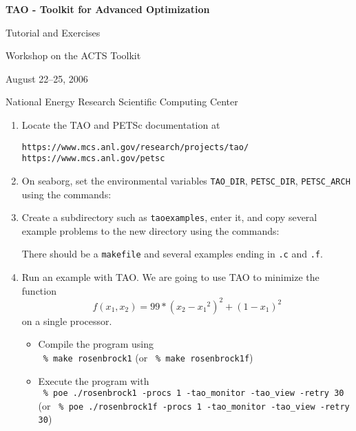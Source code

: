 \documentclass[11pt]{article}
\begin{document}
\begin{center}
{\bf
TAO - Toolkit for Advanced Optimization
        
Tutorial and Exercises

\vspace{0.25in}

Workshop on the ACTS Toolkit

August 22--25, 2006

National Energy Research Scientific Computing Center
}
\end{center}
\vspace{0.25in}

\begin{enumerate}

\item Locate the TAO and PETSc documentation at 
\begin{alltt}
https://www.mcs.anl.gov/research/projects/tao/
https://www.mcs.anl.gov/petsc
\end{alltt}

\item On seaborg, set the environmental variables
\texttt{TAO\_DIR}, \texttt{PETSC\_DIR}, \texttt{PETSC\_ARCH} 
using the commands:
\begin{alltt}
% module load tao/1.8.1
% export PETSC_ARCH=rs6000_sp_g_c++
\end{alltt}

\item Create a subdirectory such as \texttt{taoexamples}, enter it, and copy several example problems to the new directory using the commands:
\begin{alltt}
% mkdir taoexamples
% cd taoexamples
% cp -R \$TAO_DIR/src/unconstrained/tutorials/* .
% ls
\end{alltt}
There should be a \texttt{makefile} and several examples ending in \texttt{.c} and \texttt{.f}.

\item Run an example with TAO.
We are going to use TAO to minimize the function 
\[
    f(x_1,x_2) = 99*(x_2-{x_1}^2)^2 + (1-x_1)^2 
\]
on a single processor.
\begin{itemize}

 \item Compile the program using \\
  \quad \texttt{ \% make rosenbrock1} 
  (or \texttt{ \% make rosenbrock1f})

 \item Execute the program with \\
  \quad \texttt{ \% poe ./rosenbrock1 -procs 1 -tao\_monitor -tao\_view -retry 30} (or
  \texttt{ \% poe ./rosenbrock1f -procs 1 -tao\_monitor -tao\_view -retry 30})


\end{itemize}
\end{enumerate}
\end{document}
